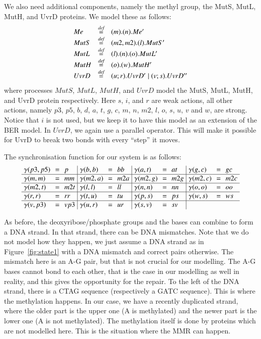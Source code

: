 We also need additional components, namely the methyl group, the MutS, MutL, MutH, and UvrD proteins. We model these as follows:
$$\begin{array}{lll}
Me & \stackrel{\emph{def}}{=} & (m).(n).Me'\\
MutS & \stackrel{\emph{def}}{=} & (m2,m2).(l).MutS'\\
MutL & \stackrel{\emph{def}}{=} & (l).(n).(o).MutL'\\
MutH & \stackrel{\emph{def}}{=} & (o).(w).MutH'\\
UvrD & \stackrel{\emph{def}}{=} & (u;r).UvrD' \; \vert \; (v;s).UvrD''\\
\end{array}$$
%
where processes $MutS$, $MutL$, $MutH$, and $UvrD$ model the MutS, MutL, MutH, and UvrD protein respectively.  Here $s$, $i$, and $r$ are weak actions, all other actions, namely $p3$, $p5$, $b$, $d$, $a$, $t$, $g$, $c$, $m$, $n$, $m2$, $l$, $o$, $s$, $u$, $v$ and $w$, are strong. Notice that $i$ is not used, but we keep it to have this model as an extension of the BER model. In $UvrD$, we again use a  parallel operator. This will make it possible for UvrD to break two bonds with every ``step'' it moves.


The synchronisation function for our system is as follows:
%
\[\arraycolsep=3.4pt\def\arraystretch{1.0}
\begin{array}{ l c l | l c l | l c l | l c l}
\gamma(p3,p5) & = & p & \gamma(b,b) & = & bb & \gamma(a,t) & = & at &  \gamma(g,c) & = & gc \\
\hline
\gamma(m,m) & = & mm & \gamma(m2,a) & = & m2a & \gamma(m2, g) & = & m2g & \gamma(m2,c) & = & m2c \\
\hline
\gamma(m2,t) & = & m2t & \gamma(l,l) & = & ll &\gamma(n,n) & = & nn & \gamma(o,o) & = & oo\\
\hline
\gamma(r,r) & = & rr & \gamma(t,u) & = & tu &\gamma(p,s) & = & ps &\gamma(w,s) & = & ws\\
\hline
\gamma(v,p3) & = & vp3 &  \gamma(u,r) & = & ur  & \gamma(s,v) & = & sv & & & \\
\end{array}
\]

As before, the deoxyribose/phosphate groups and the bases can combine to form a DNA strand. In that strand, there can be DNA mismatches. Note that we do not model how they happen, we just assume a DNA strand as in Figure~\ref{fig:state1} with a DNA mismatch and correct pairs otherwise. The mismatch here is an A-G pair, but that is not crucial for our modelling. The A-G bases cannot bond to each other, that is the case in our modelling as well in reality, and this gives the opportunity for the repair. To the left of the DNA strand, there is a CTAG sequence (respectively a GATC sequence). This is where the methylation happens. In our case, we have a recently duplicated strand, where the older part is the upper one (A is methylated) and the newer part is the lower one (A is not methylated). The methylation itself is done by proteins which are not modelled here. This is the situation where the MMR can happen.


